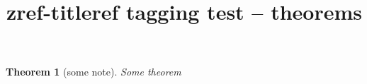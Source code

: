 \documentclass{article}
\title{zref-titleref tagging test -- theorems}
\newtheorem{theorem}{Theorem}
\begin{document}
\begin{theorem}[some note]
Some theorem
\end{theorem}
\end{document}
